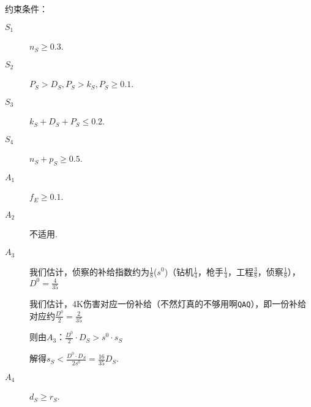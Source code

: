 \documentclass{ctexart}
\begin{document}
约束条件：

\begin{description}
    \item[$S_1$] $n_S \ge 0.3$.
    \item[$S_2$] $P_S > D_S, P_S > k_S, P_S \ge 0.1$.
    \item[$S_3$] $k_S + D_S + P_S \le 0.2$.
    \item[$S_4$] $n_S + p_S \ge 0.5$.
    \item[$A_1$] $f_E \ge 0.1$.
    \item[$A_2$] 不适用.\cite{tieba-scout}\cite{tieba-all}\cite{xiaoheihe-all}
    \item[$A_3$] 我们估计，侦察的补给指数约为$\frac{1}{8}$($s^0$)（钻机$\frac{1}{4}$，枪手$\frac{1}{4}$，工程$\frac{3}{8}$，侦察$\frac{1}{8}$），$D^0 = \frac{4}{35}$

          我们估计，4K伤害对应一份补给（不然灯真的不够用啊\verb|QAQ|），即一份补给对应约$\frac{D^0}{2} = \frac{2}{35}$

          则由$A_3$：$\frac{D^0}{2} \cdot D_S > s^0 \cdot s_S$

          解得$s_S < \frac{D^0 \cdot D_S}{2 s^0} = \frac{16}{35} D_S$.

    \item[$A_4$] $d_S \ge r_S$.
\end{description}
\end{document}
